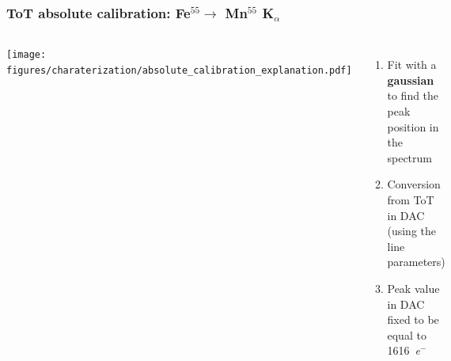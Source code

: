     \begin{frame}
        \frametitle{ToT absolute calibration: Fe$^{55} \rightarrow$ Mn$^{55}$ K$_{\alpha}$}
        \begin{columns}
                \vspace*{-0.5cm}\hspace*{+0.3cm}\texttt{[image: figures/charaterization/absolute\_calibration\_explanation.pdf]}
            \vspace*{2.5cm} 
            \begin{enumerate}
                \item Fit with a \textbf{gaussian} to find the peak position in the spectrum
                \item Conversion from ToT in DAC (using the line parameters)
                \item Peak value in DAC fixed to be equal to \SI{1616}{\elementarycharge}$^-$
            \end{enumerate} 
        \end{columns}
    \end{frame}     




